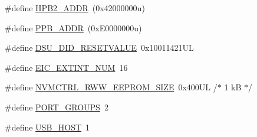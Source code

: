 \begin{DoxyCompactItemize}
\item 
\#define \mbox{\hyperlink{group___s_a_m_d21_j15_b__definitions_gaef42fa53ddf169a2a50be70d29f73571}{H\+P\+B2\+\_\+\+A\+D\+DR}}~(0x42000000u)
\item 
\#define \mbox{\hyperlink{group___s_a_m_d21_j15_b__definitions_ga8895d0a3a9a3126cc44330f86c8ce564}{P\+P\+B\+\_\+\+A\+D\+DR}}~(0x\+E0000000u)
\item 
\#define \mbox{\hyperlink{group___s_a_m_d21_j15_b__definitions_gada75131d542c9e1966238f5488f89bd6}{D\+S\+U\+\_\+\+D\+I\+D\+\_\+\+R\+E\+S\+E\+T\+V\+A\+L\+UE}}~0x10011421\+UL
\item 
\#define \mbox{\hyperlink{group___s_a_m_d21_j15_b__definitions_ga88ebc38c95506296f5d21f82476296ae}{E\+I\+C\+\_\+\+E\+X\+T\+I\+N\+T\+\_\+\+N\+UM}}~16
\item 
\#define \mbox{\hyperlink{group___s_a_m_d21_j15_b__definitions_gacb7a115808eeb0b50bd55888f9ba65ae}{N\+V\+M\+C\+T\+R\+L\+\_\+\+R\+W\+W\+\_\+\+E\+E\+P\+R\+O\+M\+\_\+\+S\+I\+ZE}}~0x400\+U\+L /$\ast$ 1 k\+B $\ast$/
\item 
\#define \mbox{\hyperlink{group___s_a_m_d21_j15_b__definitions_gab9243ffe03a1dc631b57a495b4b3d467}{P\+O\+R\+T\+\_\+\+G\+R\+O\+U\+PS}}~2
\item 
\#define \mbox{\hyperlink{group___s_a_m_d21_j15_b__definitions_ga856aa08fb33114928cbc8635be1792e4}{U\+S\+B\+\_\+\+H\+O\+ST}}~1
\end{DoxyCompactItemize}
